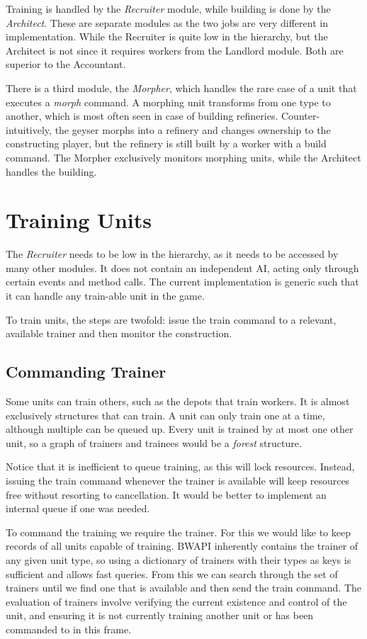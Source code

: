 Training is handled by the \emph{Recruiter} module, while building is done by the \emph{Architect}. These are separate modules as the two jobs are very different in implementation. While the Recruiter is quite low in the hierarchy, but the Architect is not since it requires workers from the Landlord module. Both are superior to the Accountant.

There is a third module, the \emph{Morpher}, which handles the rare case of a unit that executes a \emph{morph} command. A morphing unit transforms from one type to another, which is most often seen in case of building refineries. Counter-intuitively, the geyser morphs into a refinery and changes ownership to the constructing player, but the refinery is still built by a worker with a build command. The Morpher exclusively monitors morphing units, while the Architect handles the building.

\section{Training Units}
\label{sec:training}
The \emph{Recruiter} needs to be low in the hierarchy, as it needs to be accessed by many other modules. It does not contain an independent AI, acting only through certain events and method calls. The current implementation is generic such that it can handle any train-able unit in the game.

To train units, the steps are twofold: issue the train command to a relevant, available trainer and then monitor the construction.

	\subsection*{Commanding Trainer}
	Some units can train others, such as the depots that train workers. It is almost exclusively structures that can train. A unit can only train one at a time, although multiple can be queued up. Every unit is trained by at most one other unit, so a graph of trainers and trainees would be a \emph{forest} structure.
	
	Notice that it is inefficient to queue training, as this will lock resources. Instead, issuing the train command whenever the trainer is available will keep resources free without resorting to cancellation. It would be better to implement an internal queue if one was needed.
	
	To command the training we require the trainer. For this we would like to keep records of all units capable of training. BWAPI inherently contains the trainer of any given unit type, so using a dictionary of trainers with their types as keys is sufficient and allows fast queries. From this we can search through the set of trainers until we find one that is available and then send the train command. The evaluation of trainers involve verifying the current existence and control of the unit, and ensuring it is not currently training another unit or has been commanded to in this frame.
	
